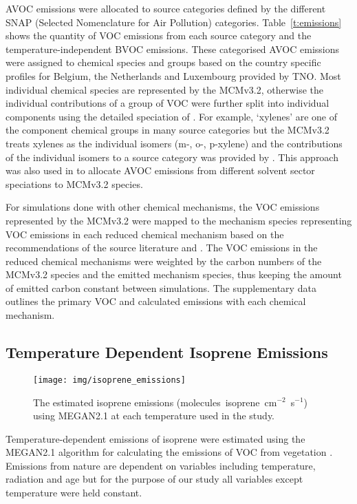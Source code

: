 AVOC emissions were allocated to source categories defined by the different SNAP (Selected Nomenclature for Air Pollution) categories.
Table~\ref{t:emissions} shows the quantity of VOC emissions from each source category and the temperature-independent BVOC emissions.
These categorised AVOC emissions were assigned to chemical species and groups based on the country specific profiles for Belgium, the Netherlands and Luxembourg provided by TNO.
Most individual chemical species are represented by the MCMv3.2, otherwise the individual contributions of a group of VOC were further split into individual components using the detailed speciation of \citet{Passant:2002}.
For example, `xylenes' are one of the component chemical groups in many source categories but the MCMv3.2 treats xylenes as the individual isomers (m-, o-, p-xylene) and the contributions of the individual isomers to a source category was provided by \citet{Passant:2002}.
This approach was also used in \citet{vonSchneidemesser:2016} to allocate AVOC emissions from different solvent sector speciations to MCMv3.2 species.

For simulations done with other chemical mechanisms, the VOC emissions represented by the MCMv3.2 were mapped to the mechanism species representing VOC emissions in each reduced chemical mechanism based on the recommendations of the source literature and \citet{Carter:2015}.
The VOC emissions in the reduced chemical mechanisms were weighted by the carbon numbers of the MCMv3.2 species and the emitted mechanism species, thus keeping the amount of emitted carbon constant between simulations. 
The supplementary data outlines the primary VOC and calculated emissions with each chemical mechanism.

\subsection{Temperature Dependent Isoprene Emissions} \label{ss:megan}
\begin{figure}[t]%
    \centering%
    \caption{The estimated isoprene emissions (molecules~isoprene~cm$^{-2}$~s$^{-1}$) using MEGAN2.1 at each temperature used in the study.}
    \label{f:isoprene_emissions}%
    \texttt{[image: img/isoprene\_emissions]}
\end{figure}
Temperature-dependent emissions of isoprene were estimated using the MEGAN2.1 algorithm for calculating the emissions of VOC from vegetation \citep{Guenther:2012}.
Emissions from nature are dependent on variables including temperature, radiation and age but for the purpose of our study all variables except temperature were held constant.

